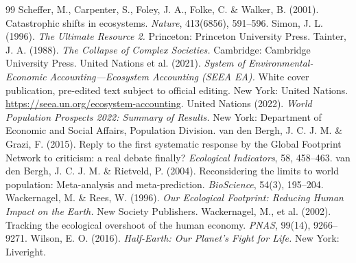 \documentclass[11pt,a4paper]{article}
\begin{document}
\begin{thebibliography}{99}
 Scheffer, M., Carpenter, S., Foley, J. A., Folke, C. \& Walker, B. (2001). Catastrophic shifts in ecosystems. \emph{Nature}, 413(6856), 591--596.
 Simon, J. L. (1996). \emph{The Ultimate Resource 2.} Princeton: Princeton University Press.
 Tainter, J. A. (1988). \emph{The Collapse of Complex Societies.} Cambridge: Cambridge University Press.
 United Nations et al. (2021). \emph{System of Environmental-Economic Accounting---Ecosystem Accounting (SEEA EA).} White cover publication, pre-edited text subject to official editing. New York: United Nations. \url{https://seea.un.org/ecosystem-accounting}.
 United Nations (2022). \emph{World Population Prospects 2022: Summary of Results.} New York: Department of Economic and Social Affairs, Population Division.
 van den Bergh, J. C. J. M. \& Grazi, F. (2015). Reply to the first systematic response by the Global Footprint Network to criticism: a real debate finally? \emph{Ecological Indicators}, 58, 458--463.
 van den Bergh, J. C. J. M. \& Rietveld, P. (2004). Reconsidering the limits to world population: Meta-analysis and meta-prediction. \emph{BioScience}, 54(3), 195--204.
 Wackernagel, M. \& Rees, W. (1996). \emph{Our Ecological Footprint: Reducing Human Impact on the Earth.} New Society Publishers.
 Wackernagel, M., et al. (2002). Tracking the ecological overshoot of the human economy. \emph{PNAS}, 99(14), 9266--9271.
 Wilson, E. O. (2016). \emph{Half-Earth: Our Planet's Fight for Life.} New York: Liveright.
\end{thebibliography}
\end{document}
